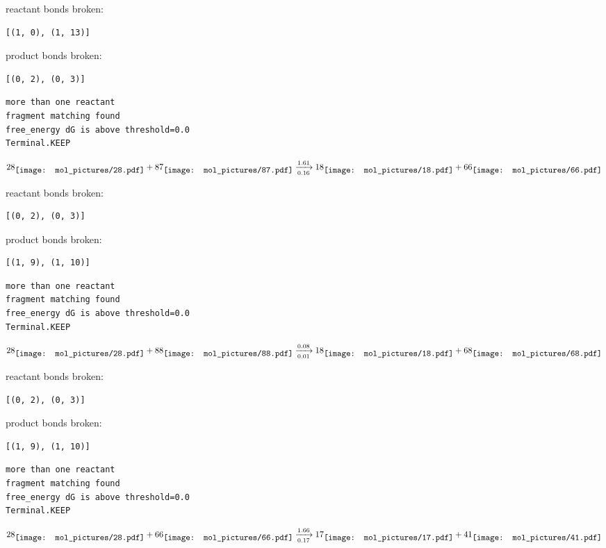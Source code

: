 \documentclass{article}
\begin{document}
reactant bonds broken:\begin{verbatim}
[(1, 0), (1, 13)]
\end{verbatim}
product bonds broken:\begin{verbatim}
[(0, 2), (0, 3)]
\end{verbatim}




\vspace{1cm}
\begin{verbatim}
more than one reactant
fragment matching found
free_energy dG is above threshold=0.0
Terminal.KEEP
\end{verbatim}
$$
28
\raisebox{-.5\height}{\texttt{[image: mol\_pictures/28.pdf]}}
+
87
\raisebox{-.5\height}{\texttt{[image: mol\_pictures/87.pdf]}}
\xrightarrow[0.16]{1.61}
18
\raisebox{-.5\height}{\texttt{[image: mol\_pictures/18.pdf]}}
+
66
\raisebox{-.5\height}{\texttt{[image: mol\_pictures/66.pdf]}}
$$


reactant bonds broken:\begin{verbatim}
[(0, 2), (0, 3)]
\end{verbatim}
product bonds broken:\begin{verbatim}
[(1, 9), (1, 10)]
\end{verbatim}




\vspace{1cm}
\begin{verbatim}
more than one reactant
fragment matching found
free_energy dG is above threshold=0.0
Terminal.KEEP
\end{verbatim}
$$
28
\raisebox{-.5\height}{\texttt{[image: mol\_pictures/28.pdf]}}
+
88
\raisebox{-.5\height}{\texttt{[image: mol\_pictures/88.pdf]}}
\xrightarrow[0.01]{0.08}
18
\raisebox{-.5\height}{\texttt{[image: mol\_pictures/18.pdf]}}
+
68
\raisebox{-.5\height}{\texttt{[image: mol\_pictures/68.pdf]}}
$$


reactant bonds broken:\begin{verbatim}
[(0, 2), (0, 3)]
\end{verbatim}
product bonds broken:\begin{verbatim}
[(1, 9), (1, 10)]
\end{verbatim}




\vspace{1cm}
\begin{verbatim}
more than one reactant
fragment matching found
free_energy dG is above threshold=0.0
Terminal.KEEP
\end{verbatim}
$$
28
\raisebox{-.5\height}{\texttt{[image: mol\_pictures/28.pdf]}}
+
66
\raisebox{-.5\height}{\texttt{[image: mol\_pictures/66.pdf]}}
\xrightarrow[0.17]{1.66}
17
\raisebox{-.5\height}{\texttt{[image: mol\_pictures/17.pdf]}}
+
41
\raisebox{-.5\height}{\texttt{[image: mol\_pictures/41.pdf]}}
$$
\end{document}
